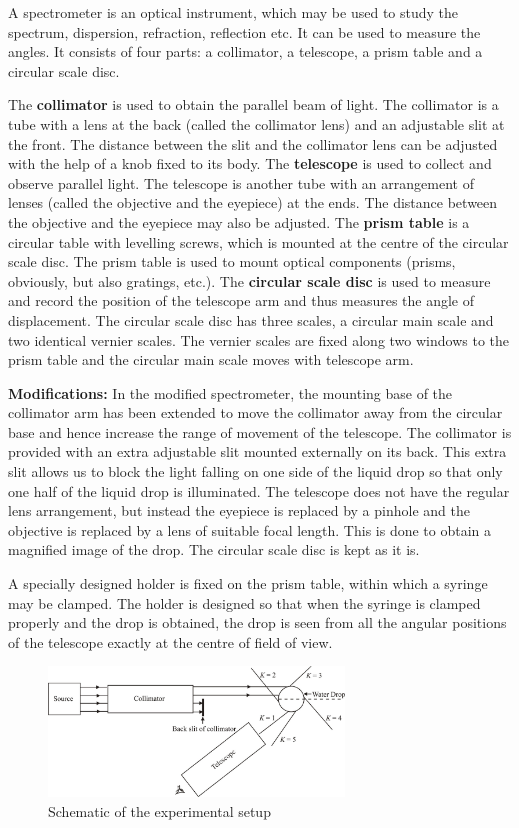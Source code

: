 A spectrometer is an optical instrument, which may be used to study the spectrum, dispersion, refraction, reflection etc. It can be used to measure the angles. It consists of four parts: a collimator, a telescope, a prism table and a circular scale disc.

The \textbf{collimator} is used to obtain the parallel beam of light. The collimator is a tube with a lens at the back (called the collimator lens) and an adjustable slit at the front. The distance between the slit and the collimator lens can be adjusted with the help of a knob fixed to its body. The \textbf{telescope} is used to collect and observe parallel light. The telescope is another tube with an arrangement of lenses (called the objective and the eyepiece) at the ends. The distance between the objective and the eyepiece may also be adjusted. The \textbf{prism table} is a circular table with levelling screws, which is mounted at the centre of the circular scale disc. The prism table is used to mount optical components (prisms, obviously, but also gratings, etc.).  The \textbf{circular scale disc} is used to measure and record the position of the telescope arm and thus measures the angle of displacement. The circular scale disc has three scales, a circular main scale and two identical vernier scales. The vernier scales are fixed along two windows to the prism table and the circular main scale moves with telescope arm.  

\textbf{Modifications:} In the modified spectrometer, the mounting base of the collimator arm has been extended to move the collimator away from the circular base and hence increase the range of movement of the telescope. The collimator is provided with an extra adjustable slit mounted externally on its back. This extra slit allows us to block the light falling on one side of the liquid drop so that only one half of the liquid drop is illuminated. The telescope does not have the regular lens arrangement, but instead the eyepiece is replaced by a pinhole and the objective is replaced by a lens of suitable focal length. This is done to obtain a magnified image of the drop. The circular scale disc is kept as it is. 

A specially designed holder is fixed on the prism table, within which a syringe may be clamped. The holder is designed so that when the syringe is clamped properly and the drop is obtained, the drop is seen from all the angular positions of the telescope exactly at the centre of field of view. 

\begin{figure}[!htb]
    \centering
    \includegraphics[width=0.70\textwidth]{figs/img2.jpg}
    \caption{Schematic of the experimental setup}
    \label{fig:experimentalsetup}
\end{figure}

